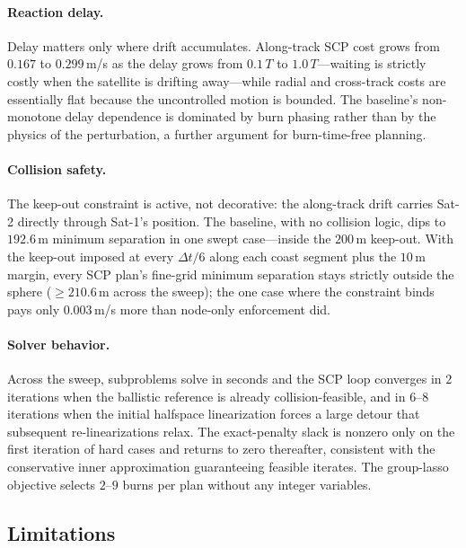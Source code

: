 \documentclass[10pt,twocolumn,letterpaper]{article}
\begin{document}
\paragraph{Reaction delay.}
Delay matters only where drift accumulates. Along-track SCP cost grows from
$0.167$ to $0.299$\,m/s as the delay grows from $0.1\,T$ to $1.0\,T$---waiting
is strictly costly when the satellite is drifting away---while radial and
cross-track costs are essentially flat because the uncontrolled motion is
bounded. The baseline's non-monotone delay dependence is dominated by burn
phasing rather than by the physics of the perturbation, a further argument
for burn-time-free planning.

\paragraph{Collision safety.}
The keep-out constraint is active, not decorative: the along-track drift
carries Sat-2 directly through Sat-1's position. The baseline, with no
collision logic, dips to $192.6$\,m minimum separation in one swept
case---inside the $200$\,m keep-out. With the keep-out imposed at every
$\Delta t/6$ along each coast segment plus the $10$\,m margin, every SCP
plan's fine-grid minimum separation stays strictly outside the sphere
($\geq 210.6$\,m across the sweep); the one case where the constraint binds
pays only $0.003$\,m/s more than node-only enforcement did.

\paragraph{Solver behavior.}
Across the sweep, subproblems solve in seconds and the SCP loop converges in
$2$ iterations when the ballistic reference is already collision-feasible,
and in $6$--$8$ iterations when the initial halfspace linearization forces a
large detour that subsequent re-linearizations relax. The exact-penalty slack
is nonzero only on the first iteration of hard cases and returns to zero
thereafter, consistent with the conservative inner approximation guaranteeing
feasible iterates. The group-lasso objective selects $2$--$9$ burns per plan
without any integer variables.

\subsection{Limitations}
\end{document}
